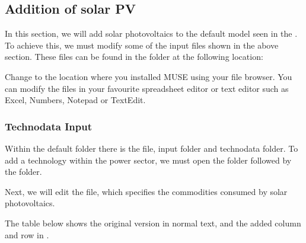 \documentclass[letterpaper,10pt,english]{sphinxmanual}
\begin{document}
\subsection{Addition of solar PV}
\label{\detokenize{user-guide/add-solar:Addition-of-solar-PV}}
In this section, we will add solar photovoltaics to the default model seen in the {\hyperref[\detokenize{running-muse-example::doc}]{}}. To achieve this, we must modify some of the input files shown in the above section. These files can be found in the  folder at the following location:


Change  to the location where you installed MUSE using your file browser. You can modify the files in your favourite spreadsheet editor or text editor such as Excel, Numbers, Notepad or TextEdit.


\subsubsection{Technodata Input}
\label{\detokenize{user-guide/add-solar:Technodata-Input}}
Within the default folder there is the  file, input folder and technodata folder. To add a technology within the power sector, we must open the  folder followed by the  folder.

Next, we will edit the  file, which specifies the commodities consumed by solar photovoltaics.

The table below shows the original  version in normal text, and the added column and row in .
\end{document}
